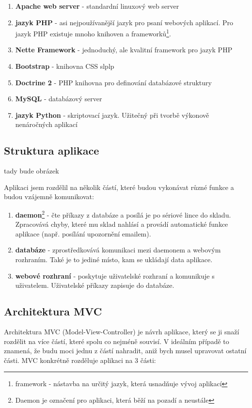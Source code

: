 \documentclass[12pt, a4paper, oneside]{article}
\begin{document}
\begin{enumerate}
\item \textbf{Apache web server} - standardní linuxový web server
\item \textbf{jazyk PHP} - asi nejpoužívanější jazyk pro psaní webových aplikací. Pro jazyk PHP existuje mnoho knihoven a frameworků\footnote{framework - nástavba na určitý jazyk, která usnadňuje vývoj aplikací}.
\item \textbf{Nette Framework} - jednoduchý, ale kvalitní framework pro jazyk PHP
\item \textbf{Bootstrap} - knihovna CSS slplp
\item \textbf{Doctrine 2} - PHP knihovna pro definování databázové struktury
\item \textbf{MySQL} - databázový server
\item \textbf{jazyk Python} - skriptovací jazyk. Užitečný při tvorbě výkonově nenáročných aplikací
\end{enumerate}

\subsection{Struktura aplikace}

tady bude obrázek

Aplikaci jsem rozdělil na několik částí, které budou vykonávat různé funkce a budou vzájemně komunikovat:
\begin{enumerate}
\item \textbf{daemon}\footnote{Daemon je označení pro aplikaci, která běží na pozadí a neustále} - čte příkazy z databáze a posílá je po sériové lince do skladu. Zpracovává chyby, které mu sklad nahlásí a provádí automatické funkce aplikace (např. posílání upozornění emailem).
\item \textbf{databáze} - zprostředkovává komunikaci mezi daemonem a webovým rozhraním. Také je to jediné místo, kam se ukládají data aplikace.
\item \textbf{webové rozhraní} - poskytuje uživatelské rozhraní a komunikuje s uživatelem. Uživatelské příkazy zapisuje do databáze.
\end{enumerate}

\subsection{Architektura MVC}

Architektura MVC (Model-View-Controller) je návrh aplikace, který se ji snaží rozdělit na více částí, které spolu co nejméně souvisí.
V ideálním případě to znamená, že budu moci jednu z částí nahradit, aniž bych musel upravovat ostatní části.
MVC konkrétně rozděluje aplikaci na 3 části:
\end{document}
